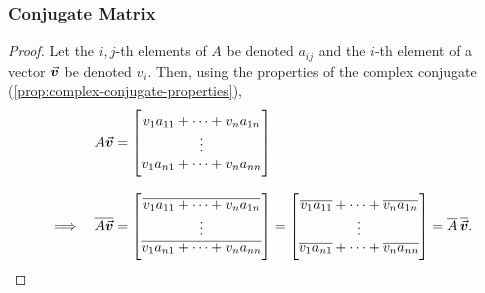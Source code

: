 \documentclass[../MathsNotesBase.tex]{subfiles}
\begin{document}
{		
		\biggerskip
		\subsubsection{Conjugate Matrix}
		
		\medskip
		\begin{proof}
			Let the $i,j$-th elements of $A$ be denoted $a_{ij}$ and the $i$-th element of a vector $\vec{\bm{v}}$ be denoted $v_i$. Then, using the properties of the complex conjugate (\ref{prop:complex-conjugate-properties}),
			\[\begin{aligned}
				&& A\v &= \begin{bmatrix}
					v_1 a_{11} + \cdots + v_n a_{1n}\\
					\vdots \\
					v_1 a_{n1} + \cdots + v_n a_{nn}
				\end{bmatrix} \nnn
				&\implies & \conj{A\v} &= 	\begin{bmatrix}
												\conj{v_1 a_{11} + \cdots + v_n a_{1n}}\\
												\vdots \\
												\conj{v_1 a_{n1} + \cdots + v_n a_{nn}}
											\end{bmatrix}  
										= 	\begin{bmatrix}
												\conj{v_1} \conj{a_{11}} + \cdots + \conj{v_n} \conj{a_{1n}}\\
												\vdots \\
												\conj{v_1} \conj{a_{n1}} + \cdots + \conj{v_n} \conj{a_{nn}}
											\end{bmatrix}
										= \conj{A} \, \conj{\v}. \qedhere
			\end{aligned}\]
		\end{proof}
	}


\end{document}

